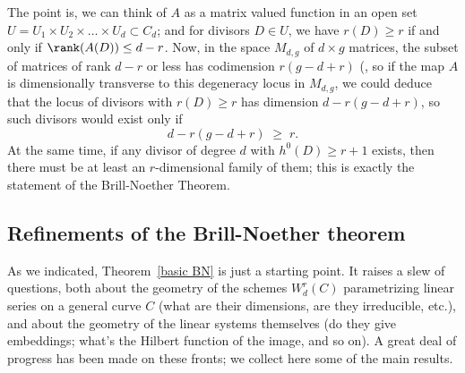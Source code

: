 The point is, we can think of $A$ as a matrix valued function in an open set $U = U_1 \times U_2 \times \dots \times U_d \subset C_d$; and for divisors $D \in U$, we have $r(D) \geq r$ if and only if $\rank(A(D)) \leq d-r$. Now, in the space $M_{d,g}$ of $d \times g$ matrices, the subset of matrices of rank $d-r$ or less has codimension $r(g-d+r)$ (\cite[Theorem ****]{Eisenbud1995},  so if the map $A$ is dimensionally transverse to this degeneracy locus in $M_{d,g}$, we could deduce that the locus of divisors with $r(D) \geq r$ has dimension $d - r(g-d+r)$, so such divisors would exist only if
$$
d - r(g-d+r) \; \geq \; r.
$$
At the same time, if any divisor of degree $d$ with $h^0(D) \geq r+1$ exists, then there must be at least an $r$-dimensional family of them; this is exactly the statement of the Brill-Noether Theorem.


\subsection{Refinements of the Brill-Noether theorem}

As we indicated, Theorem~\ref{basic BN} is just a starting point. It raises a slew of questions, both about the geometry of the schemes $W^r_d(C)$ parametrizing linear series on a general curve $C$ (what are their dimensions, are they irreducible, etc.), and about the geometry of the linear systems themselves (do they give embeddings; what's the Hilbert function of the image, and so on). A great deal of progress has been made on these fronts; we collect here some of the main results.


